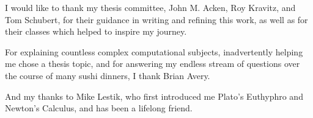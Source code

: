 \noindent I would like to thank my thesis committee, John M. Acken, Roy Kravitz, and Tom Schubert, for their guidance in writing and refining this work, as well as for their classes which helped to inspire my journey.

\vspace{1cm}

\noindent For explaining countless complex computational subjects, inadvertently helping me chose a thesis topic, and for answering my endless stream of questions over the course of many sushi dinners, I thank Brian Avery.

\vspace{1cm}

\noindent And my thanks to Mike Lestik, who first introduced me Plato's Euthyphro and Newton's Calculus, and has been a lifelong friend.
